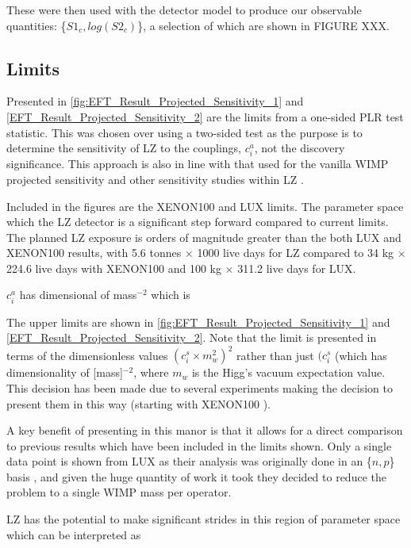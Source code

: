 \par
These were then used with the detector model to produce our observable quantities: \{$S1_c,log(S2_c)$\}, a selection of which are shown in FIGURE XXX.

%


\subsection{Limits}
\par
Presented in \autoref{fig:EFT_Result_Projected_Sensitivity_1} and \autoref{EFT_Result_Projected_Sensitivity_2} are the limits from a one-sided PLR test statistic.
This was chosen over using a two-sided test as the purpose is to determine the sensitivity of LZ to the couplings, $c^{a}_i$, not the discovery significance. 
This approach is also in line with that used for the vanilla WIMP projected sensitivity \cite{LZ_projected_sensitivity_paper_ref} and other sensitivity studies within LZ \cite{LZ_Ibles_LZStats_Thesis_ref, umituktu_thesis_ref}.
\par
Included in the figures are the XENON100 \cite{xenon100_eft_ref} and LUX \cite{LUX_RUN4_EFT_2021} limits.
The parameter space which the LZ detector is a significant step forward compared to current limits.
The planned LZ exposure is orders of magnitude greater than the both LUX and XENON100 results, with 5.6 tonnes $\times$ 1000 live days for LZ compared to 34 kg $\times$ 224.6 live days with XENON100 and 100 kg $\times$ 311.2 live days for LUX.

$c^a_i$ has dimensional of mass$^{-2}$ which is 

The upper limits are shown in \autoref{fig:EFT_Result_Projected_Sensitivity_1} and \autoref{EFT_Result_Projected_Sensitivity_2}.
Note that the limit is presented in terms of the dimensionless values $({c}^{s}_{i}\times{m}^{2}_{w})^{2}$ rather than just $({c}^{s}_{i}$ (which has dimensionality of [mass]$^{-2}$, where $m_w$ is the Higg's vacuum expectation value.
This decision has been made due to several experiments making the decision to present them in this way (starting with XENON100 \cite{xenon100_eft_ref}).
\par
A key benefit of presenting in this manor is that it allows for a direct comparison to previous results which have been included in the limits shown.
Only a single data point is shown from LUX as their analysis was originally done in an \{$n,p$\} basis \cite{LUX_RUN4_EFT_2021}, and given the huge quantity of work it took they decided to reduce the problem to a single WIMP mass per operator.
\par
LZ has the potential to make significant strides in this region of parameter space which can be interpreted as 


